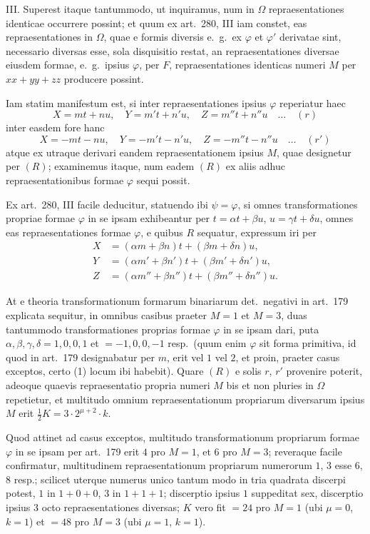 \documentclass[12pt,a4paper]{article}
\theoremstyle{plain}
\theoremstyle{definition}
\theoremstyle{remark}
\begin{document}
\textsc{III.} Superest itaque tantummodo, ut inquiramus, num in $\Omega$ repraesentationes identicae occurrere possint; et quum ex art.~280, III iam constet, eas repraesentationes in $\Omega$, quae e formis diversis e.~g.~ex $\varphi$ et $\varphi'$ derivatae sint, necessario diversas esse, sola disquisitio restat, an repraesentationes diversae eiusdem formae, e.~g.~ipsius $\varphi$, per $F$, repraesentationes identicas numeri $M$ per $xx + yy + zz$ producere possint.

Iam statim manifestum est, si inter repraesentationes ipsius $\varphi$ reperiatur haec
\[
X = mt + nu,\quad Y = m't + n'u,\quad Z = m''t + n''u \quad\ldots\quad (r)
\]
inter easdem fore hanc
\[
X = -mt - nu,\quad Y = -m't - n'u,\quad Z = -m''t - n''u \quad\ldots\quad (r')
\]
atque ex utraque derivari eandem repraesentationem ipsius $M$, quae designetur per $(R)$; examinemus itaque, num eadem $(R)$ ex aliis adhuc repraesentationibus formae $\varphi$ sequi possit.

Ex art.~280, III facile deducitur, statuendo ibi $\psi = \varphi$, si omnes transformationes propriae formae $\varphi$ in se ipsam exhibeantur per $t = \alpha t + \beta u$, $u = \gamma t + \delta u$, omnes eas repraesentationes formae $\varphi$, e quibus $R$ sequatur, expressum iri per
\begin{align*}
X &= (\alpha m + \beta n)t + (\beta m + \delta n)u, \\
Y &= (\alpha m' + \beta n')t + (\beta m' + \delta n')u, \\
Z &= (\alpha m'' + \beta n'')t + (\beta m'' + \delta n'')u.
\end{align*}

At e theoria transformationum formarum binariarum det.~negativi in art.~179 explicata sequitur, in omnibus casibus praeter $M = 1$ et $M = 3$, duas tantummodo transformationes proprias formae $\varphi$ in se ipsam dari, puta $\alpha,\beta,\gamma,\delta = 1,0,0,1$ et $= -1,0,0,-1$ resp.~(quum enim $\varphi$ sit forma primitiva, id quod in art.~179 designabatur per $m$, erit vel $1$ vel $2$, et proin, praeter casus exceptos, certo (1) locum ibi habebit). Quare $(R)$ e solis $r$, $r'$ provenire poterit, adeoque quaevis repraesentatio propria numeri $M$ bis et non pluries in $\Omega$ repetietur, et multitudo omnium repraesentationum propriarum diversarum ipsius $M$ erit $\tfrac{1}{2}K = 3 \cdot 2^{\mu+2} \cdot k$.

Quod attinet ad casus exceptos, multitudo transformationum propriarum formae $\varphi$ in se ipsam per art.~179 erit $4$ pro $M = 1$, et $6$ pro $M = 3$; reveraque facile confirmatur, multitudinem repraesentationum propriarum numerorum $1$, $3$ esse $6$, $8$ resp.; scilicet uterque numerus unico tantum modo in tria quadrata discerpi potest, $1$ in $1 + 0 + 0$, $3$ in $1 + 1 + 1$; discerptio ipsius $1$ suppeditat sex, discerptio ipsius $3$ octo repraesentationes diversas; $K$ vero fit $= 24$ pro $M = 1$ (ubi $\mu = 0$, $k = 1$) et $= 48$ pro $M = 3$ (ubi $\mu = 1$, $k = 1$).
\end{document}
